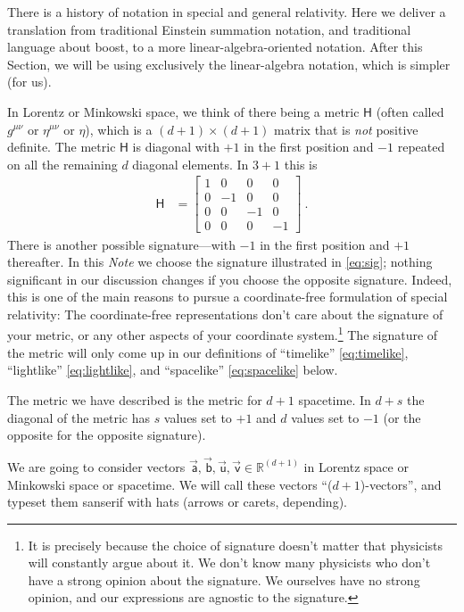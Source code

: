 \documentclass{article}
\newcommand{\metric}{\mathsf{H}}
\newcommand\upvec[1]{\!\vec{\,\mathrm{#1}}}
\newcommand{\Lvec}[1]{\upvec{\mathsf{#1}}} %
\newcommand{\plus}{\!+\!} %
\newcommand{\documentname}{\textsl{Note}}
\begin{document}
There is a history of notation in special and general relativity.
Here we deliver a translation from traditional Einstein summation notation, and traditional language about boost, to a more linear-algebra-oriented notation.
After this Section, we will be using exclusively the linear-algebra notation, which is simpler (for us).

In Lorentz or Minkowski space, we think of there being a metric $\metric$ (often called $g^{\mu\nu}$ or $\eta^{\mu\nu}$ or $\eta$), which is a $(d\plus1)\times(d\plus1)$ matrix that is \emph{not} positive definite.
The metric $\metric$ is diagonal with $+1$ in the first position and $-1$ repeated on all the remaining $d$ diagonal elements.
In $3\plus1$ this is
\begin{align}\label{eq:sig}
    \metric &= \begin{bmatrix}1 & 0 & 0 & 0\\
                              0 & -1 & 0 & 0\\
                              0 & 0 & -1 & 0\\
                              0 & 0 & 0 & -1\end{bmatrix} ~.
\end{align}
There is another possible signature---with $-1$ in the first position and $+1$ thereafter.
In this \documentname{} we choose the signature illustrated in \eqref{eq:sig}; nothing significant in our discussion changes if you choose the opposite signature.
Indeed, this is one of the main reasons to pursue a coordinate-free formulation of special relativity:
The coordinate-free representations don't care about the signature of your metric, or any other aspects of your coordinate system.\footnote{It is precisely because the choice of signature doesn't matter that physicists will constantly argue about it. We don't know many physicists who don't have a strong opinion about the signature. We ourselves have no strong opinion, and our expressions are agnostic to the signature.}
The signature of the metric will only come up in our definitions of ``timelike'' \eqref{eq:timelike}, ``lightlike'' \eqref{eq:lightlike}, and ``spacelike'' \eqref{eq:spacelike} below.

The metric we have described is the metric for $d\plus 1$ spacetime.
In $d\plus s$ the diagonal of the metric has $s$ values set to $+1$ and $d$ values set to $-1$ (or the opposite for the opposite signature).

We are going to consider vectors $\Lvec{a}, \Lvec{b}, \Lvec{u}, \Lvec{v}\in\mathbb{R}^{(d+1)}$ in Lorentz space or Minkowski space or spacetime.
We will call these vectors ``($d\plus1$)-vectors'', and typeset them sanserif with hats (arrows or carets, depending).
\end{document}
